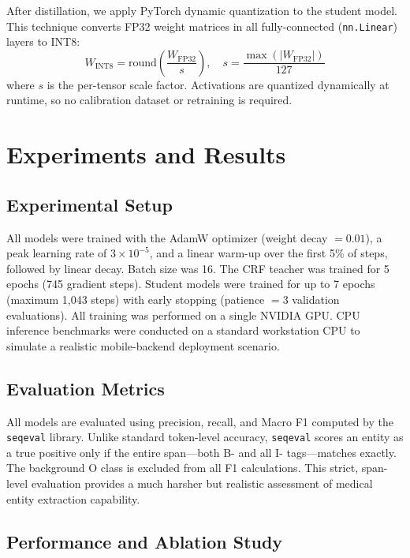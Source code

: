 \documentclass[conference]{IEEEtran}
\begin{document}
After distillation, we apply PyTorch dynamic quantization to the student model. This technique converts FP32 weight matrices in all fully-connected (\texttt{nn.Linear}) layers to INT8:
%
\begin{equation}
  W_{\mathrm{INT8}} = \mathrm{round}\!\left(\frac{W_{\mathrm{FP32}}}{s}\right), \quad
  s = \frac{\max(|W_{\mathrm{FP32}}|)}{127}
  \label{eq:quant}
\end{equation}
%
where $s$ is the per-tensor scale factor. Activations are quantized dynamically at runtime, so no calibration dataset or retraining is required.

\section{Experiments and Results}

\subsection{Experimental Setup}
All models were trained with the AdamW optimizer (weight decay $= 0.01$), a peak learning rate of $3 \times 10^{-5}$, and a linear warm-up over the first 5\% of steps, followed by linear decay. Batch size was 16. The CRF teacher was trained for 5 epochs (745 gradient steps). Student models were trained for up to 7 epochs (maximum 1,043 steps) with early stopping (patience $= 3$ validation evaluations). All training was performed on a single NVIDIA GPU. CPU inference benchmarks were conducted on a standard workstation CPU to simulate a realistic mobile-backend deployment scenario.

\subsection{Evaluation Metrics}
All models are evaluated using precision, recall, and Macro F1 computed by the \texttt{seqeval} library. Unlike standard token-level accuracy, \texttt{seqeval} scores an entity as a true positive only if the entire span---both B- and all I- tags---matches exactly. The background O class is excluded from all F1 calculations. This strict, span-level evaluation provides a much harsher but realistic assessment of medical entity extraction capability.

\subsection{Performance and Ablation Study}
\end{document}
